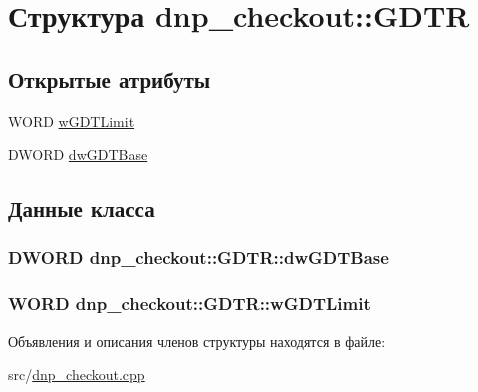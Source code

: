 \hypertarget{structdnp__checkout_1_1_g_d_t_r}{\section{Структура dnp\-\_\-checkout\-:\-:G\-D\-T\-R}
\label{structdnp__checkout_1_1_g_d_t_r}
}
\subsection*{Открытые атрибуты}
\begin{DoxyCompactItemize}
\item 
W\-O\-R\-D \hyperlink{structdnp__checkout_1_1_g_d_t_r_a7b18797e2f146addc95824e0944accb9}{w\-G\-D\-T\-Limit}
\item 
D\-W\-O\-R\-D \hyperlink{structdnp__checkout_1_1_g_d_t_r_abdf0f8d23d4c3edfa3b7cbb3e4e67bc4}{dw\-G\-D\-T\-Base}
\end{DoxyCompactItemize}


\subsection{Данные класса}
\hypertarget{structdnp__checkout_1_1_g_d_t_r_abdf0f8d23d4c3edfa3b7cbb3e4e67bc4}{
\subsubsection[{dw\-G\-D\-T\-Base}]{\setlength{\rightskip}{0pt plus 5cm}D\-W\-O\-R\-D dnp\-\_\-checkout\-::\-G\-D\-T\-R\-::dw\-G\-D\-T\-Base}}\label{structdnp__checkout_1_1_g_d_t_r_abdf0f8d23d4c3edfa3b7cbb3e4e67bc4}
\hypertarget{structdnp__checkout_1_1_g_d_t_r_a7b18797e2f146addc95824e0944accb9}{
\subsubsection[{w\-G\-D\-T\-Limit}]{\setlength{\rightskip}{0pt plus 5cm}W\-O\-R\-D dnp\-\_\-checkout\-::\-G\-D\-T\-R\-::w\-G\-D\-T\-Limit}}\label{structdnp__checkout_1_1_g_d_t_r_a7b18797e2f146addc95824e0944accb9}


Объявления и описания членов структуры находятся в файле\-:\begin{DoxyCompactItemize}
\item 
src/\hyperlink{dnp__checkout_8cpp}{dnp\-\_\-checkout.\-cpp}\end{DoxyCompactItemize}
